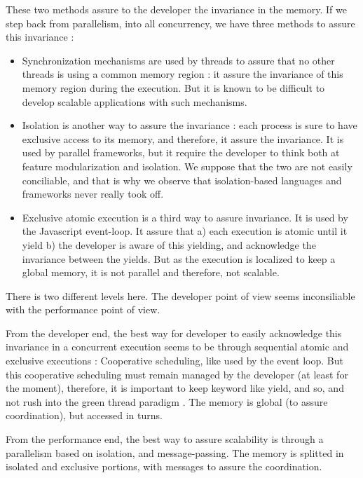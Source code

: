 These two methods assure to the developer the invariance in the memory.
If we step back from parallelism, into all concurrency, we have three methods to assure this invariance :
\begin{itemize}
\item Synchronization mechanisms are used by threads to assure that no other threads is using a common memory region : it assure the invariance of this memory region during the execution. But it is known to be difficult to develop scalable applications with such mechanisms.
\item Isolation is another way to assure the invariance : each process is sure to have exclusive access to its memory, and therefore, it assure the invariance.
It is used by parallel frameworks, but it require the developer to think both at feature modularization and isolation.
We suppose that the two are not easily conciliable, and that is why we observe that isolation-based languages and frameworks never really took off.
\item Exclusive atomic execution is a third way to assure invariance. It is used by the Javascript event-loop. It assure that a) each execution is atomic until it yield b) the developer is aware of this yielding, and acknowledge the invariance between the yields.
But as the execution is localized to keep a global memory, it is not parallel and therefore, not scalable.
\end{itemize}

There is two different levels here.
The developer point of view seems inconsiliable with the performance point of view.

From the developer end, the best way for developer to easily acknowledge this invariance in a concurrent execution seems to be through sequential atomic and exclusive executions : Cooperative scheduling, like used by the event loop.
But this cooperative scheduling must remain managed by the developer (at least for the moment), therefore, it is important to keep keyword like yield, and so, and not rush into the green thread paradigm .
The memory is global (to assure coordination), but accessed in turns.

From the performance end, the best way to assure scalability is through a parallelism based on isolation, and message-passing.
The memory is splitted in isolated and exclusive portions, with messages to assure the coordination.

